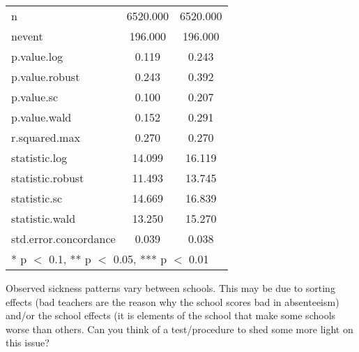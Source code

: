 \documentclass[
]{article}
\begin{document}
\begin{table}[!h]
\begin{tabular}[t]{lcc}
n & \num{6520.000} & \num{6520.000}\\
nevent & \num{196.000} & \num{196.000}\\
p.value.log & \num{0.119} & \num{0.243}\\
p.value.robust & \num{0.243} & \num{0.392}\\
p.value.sc & \num{0.100} & \num{0.207}\\
p.value.wald & \num{0.152} & \num{0.291}\\
r.squared.max & \num{0.270} & \num{0.270}\\
statistic.log & \num{14.099} & \num{16.119}\\
statistic.robust & \num{11.493} & \num{13.745}\\
statistic.sc & \num{14.669} & \num{16.839}\\
statistic.wald & \num{13.250} & \num{15.270}\\
std.error.concordance & \num{0.039} & \num{0.038}\\
\bottomrule
\multicolumn{3}{l}{\rule{0pt}{1em}* p $<$ 0.1, ** p $<$ 0.05, *** p $<$ 0.01}\\
\end{tabular}
\end{table}

Observed sickness patterns vary between schools. This may be due to
sorting effects (bad teachers are the reason why the school scores bad
in absenteeism) and/or the school effects (it is elements of the school
that make some schools worse than others. Can you think of a
test/procedure to shed some more light on this issue?
\end{document}
